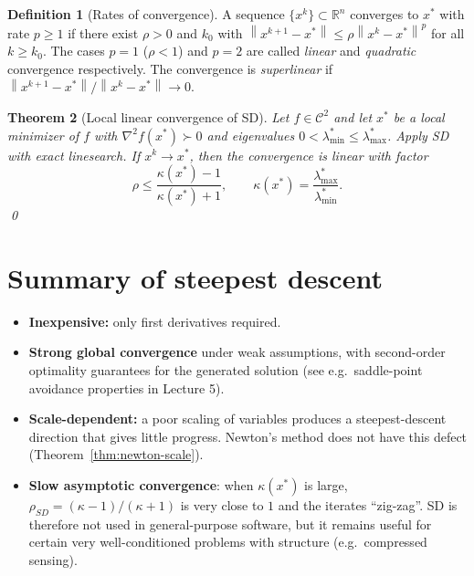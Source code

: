 \documentclass[11pt,a4paper]{report}
\theoremstyle{plain}
\newtheorem{theorem}{Theorem}[chapter]
\theoremstyle{definition}
\newtheorem{definition}[theorem]{Definition}
\newcommand{\R}{\mathbb{R}}
\newcommand{\norm}[1]{\left\lVert#1\right\rVert}
\newcommand{\hess}{\nabla^{2}}
\begin{document}
\begin{definition}[Rates of convergence]
A sequence $\{x^{k}\}\subset\R^{n}$ converges to $x^{*}$ with rate $p\ge 1$ if
there exist $\rho>0$ and $k_{0}$ with
$\norm{x^{k+1}-x^{*}}\le\rho\norm{x^{k}-x^{*}}^{p}$ for all $k\ge k_{0}$.
The cases $p=1$ ($\rho<1$) and $p=2$ are called \emph{linear} and
\emph{quadratic} convergence respectively. The convergence is
\emph{superlinear} if $\norm{x^{k+1}-x^{*}}/\norm{x^{k}-x^{*}}\to 0$.
\end{definition}

\begin{theorem}[Local linear convergence of SD]\label{thm:SD-local}
Let $f\in\mathcal{C}^{2}$ and let $x^{*}$ be a local minimizer of $f$ with
$\hess f(x^{*})\succ 0$ and eigenvalues $0<\lambda^{*}_{\min}\le\lambda^{*}_{\max}$.
Apply SD with exact linesearch. If $x^{k}\to x^{*}$, then the convergence is
linear with factor
\[
\rho\le \frac{\kappa(x^{*})-1}{\kappa(x^{*})+1},
\qquad
\kappa(x^{*})=\frac{\lambda^{*}_{\max}}{\lambda^{*}_{\min}}. 
\]
\qed
\end{theorem}

\section{Summary of steepest descent}

\begin{itemize}[leftmargin=2em,itemsep=0pt]
  \item \textbf{Inexpensive:} only first derivatives required.
  \item \textbf{Strong global convergence} under weak assumptions, with second-order
        optimality guarantees for the generated solution (see e.g.\ saddle-point
        avoidance properties in Lecture 5).
  \item \textbf{Scale-dependent:} a poor scaling of variables produces a
        steepest-descent direction that gives little progress. Newton's method
        does not have this defect (Theorem~\ref{thm:newton-scale}).
  \item \textbf{Slow asymptotic convergence}: when $\kappa(x^{*})$ is large,
        $\rho_{SD}=(\kappa-1)/(\kappa+1)$ is very close to $1$ and the iterates
        ``zig-zag''. SD is therefore not used in general-purpose software, but it
        remains useful for certain very well-conditioned problems with structure
        (e.g.\ compressed sensing).
\end{itemize}


\end{document}
